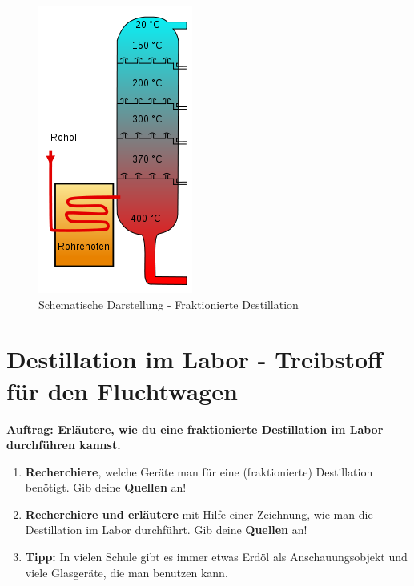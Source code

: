 \documentclass{scrartcl}  %
\begin{document}
			\begin{figure}[h]
				\centering
				\includegraphics{img/crude_oil_distillation}
				\caption{Schematische Darstellung - Fraktionierte Destillation}
			\end{figure}


		\section{Destillation im Labor - Treibstoff für den Fluchtwagen}
			
			\textbf{Auftrag: Erläutere, wie du eine fraktionierte Destillation im Labor durchführen kannst.}
			\begin{enumerate}
				\item \textbf{Recherchiere}, welche Geräte man für eine (fraktionierte) Destillation benötigt. Gib deine \textbf{Quellen} an!
				\item \textbf{Recherchiere und erläutere} mit Hilfe einer Zeichnung, wie man die Destillation im Labor durchführt. Gib deine \textbf{Quellen} an!
				\item \textbf{Tipp:} In vielen Schule gibt es immer etwas Erdöl als Anschauungsobjekt und viele Glasgeräte, die man benutzen kann.
			\end{enumerate}
	
\end{document}

